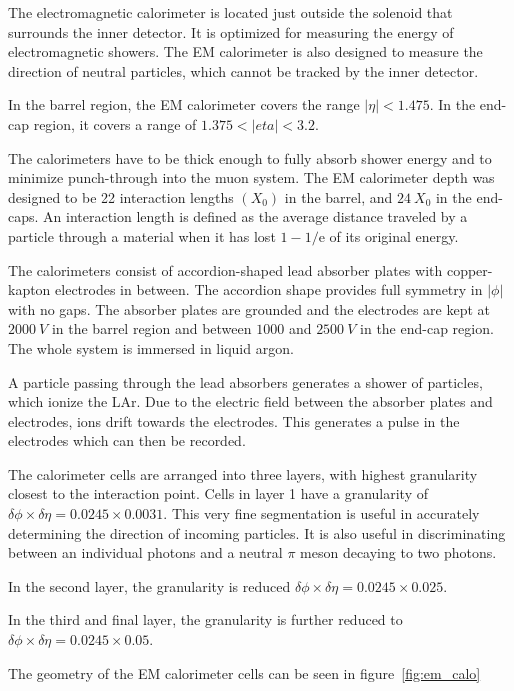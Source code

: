 The electromagnetic calorimeter is located just outside the solenoid that surrounds the inner detector.
It is optimized for measuring the energy of electromagnetic showers.
The EM calorimeter is also designed to measure the direction of neutral particles, which cannot be tracked by the inner detector.

In the barrel region, the EM calorimeter covers the range $|\eta| < 1.475$.
In the end-cap region, it covers a range of $1.375 < |eta| < 3.2$.

The calorimeters have to be thick enough to fully absorb shower energy and to minimize punch-through into the muon system.
The EM calorimeter depth was designed to be 22 interaction lengths $\left(X_0\right)$ in the barrel, and $24~X_0$ in the end-caps.
An interaction length is defined as the average distance traveled by a particle through a material when it has lost
$1 - 1/\mathrm{e}$ of its original energy.\cite{em-calo}

The calorimeters consist of accordion-shaped lead absorber plates with copper-kapton electrodes in between.
The accordion shape provides full symmetry in $|\phi|$ with no gaps.
The absorber plates are grounded and the electrodes are kept at $2000~V$ in the barrel region and between
$1000$ and $2500~V$ in the end-cap region.
The whole system is immersed in liquid argon.\cite{atlas-detector-2008}

A particle passing through the lead absorbers generates a shower of particles, which ionize the LAr.
Due to the electric field between the absorber plates and electrodes, ions drift towards the electrodes.
This generates a pulse in the electrodes which can then be recorded.

The calorimeter cells are arranged into three layers, with highest granularity closest to the interaction point.
Cells in layer 1 have a granularity of $\delta\phi \times \delta\eta = 0.0245 \times 0.0031$.
This very fine segmentation is useful in accurately determining the direction of incoming particles.
It is also useful in discriminating between an individual photons and a neutral $\pi$ meson decaying to two photons.\cite{em-calo}

In the second layer, the granularity is reduced $\delta\phi \times \delta\eta = 0.0245 \times 0.025$.

In the third and final layer, the granularity is further reduced to $\delta\phi \times \delta\eta = 0.0245 \times 0.05$.

The geometry of the EM calorimeter cells can be seen in figure~\ref{fig:em_calo}

